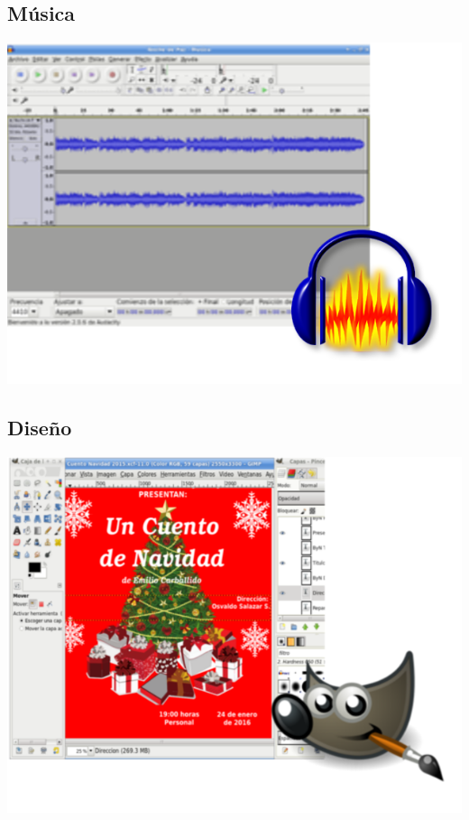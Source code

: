 \subsection{Música}
\begin{frame}
    \includegraphics[width=\textwidth]{MiAudio.png}
\end{frame}

\subsection{Diseño}
\begin{frame}
     \includegraphics[width=\textwidth]{Diseno.png}
\end{frame}

